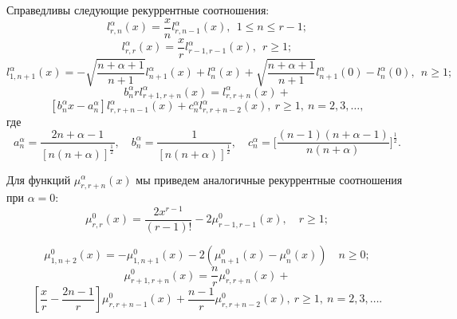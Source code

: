 \begin{theorem}\label{ramis-RItheo4}
Справедливы следующие рекуррентные соотношения:
\begin{equation*}\label{ramis-Gadz_eq14}
l_{r,n}^\alpha(x)=\frac{x}{n}l_{r,n-1}^\alpha(x), \ \ 1\leq n\leq r-1;
\end{equation*}
\begin{equation*}\label{ramis-Gadz_eq15}
l_{r,r}^\alpha(x)=\frac{x}{r}l_{r-1,r-1}^\alpha(x), \ \ r\geq 1;
\end{equation*}
\begin{equation*}\label{ramis-Gadz_eq16}
l_{1,n+1}^\alpha(x)=-\sqrt{\frac{n+\alpha+1}{n+1}} l_{n+1}^{\alpha}(x)+l_{n}^{\alpha}(x)+
\sqrt{\frac{n+\alpha+1}{n+1}} l_{n+1}^{\alpha}(0)-l_{n}^{\alpha}(0), \ \ n\geq 1;
\end{equation*}
$$
b_n^\alpha rl_{r+1,r+n}^\alpha(x)=l_{r,r+n}^{\alpha}(x)+
$$
\begin{equation*}\label{ramis-Gadz_eq17}
\left[b_n^\alpha x - a_n^\alpha\right]l_{r,r+n-1}^{\alpha}(x)
+c_{n}^\alpha l_{r,r+n-2}^{\alpha}(x), \ r\geq 1, \ n=2, 3, \ldots,
\end{equation*}
где
\begin{equation*}
a_n^\alpha=\frac{2n+\alpha-1}{[n(n+\alpha)]^\frac{1}{2}},\quad
b_n^\alpha=\frac{1}{[n(n+\alpha)]^\frac{1}{2}},\quad
c_n^\alpha=\Big[\frac{(n-1)(n+\alpha-1)}{n(n+\alpha)}\Big]^\frac{1}{2}.
\end{equation*}
\end{theorem}

\noindent Для функций $\mu_{r,r+n}^\alpha(x)$ мы приведем аналогичные рекуррентные соотношения при $\alpha=0$:
\begin{equation*}
\mu_{r,r}^0(x)=\frac{2x^{r-1}}{(r-1)!}-2\mu_{r-1,r-1}^0(x), \quad r\geq1;
\end{equation*}

\begin{equation*}
\mu_{1,n+2}^0(x) = - \mu_{1,n+1}^0(x) - 2 (\mu_{n+1}^0(x) - \mu_{n}^0(x)) \quad n\geq 0;
\end{equation*}
$$
\mu_{r+1,r+n}^0(x)=\frac{n}{r}\mu_{r,r+n}^{0}(x)+
$$
\begin{equation*}
\left[\frac{x}{r} - \frac{2n-1}{r}\right]\mu_{r,r+n-1}^{0}(x)
+\frac{n-1}{r} \mu_{r,r+n-2}^{0}(x), \ r\geq 1, \ n=2, 3, \ldots.
\end{equation*}